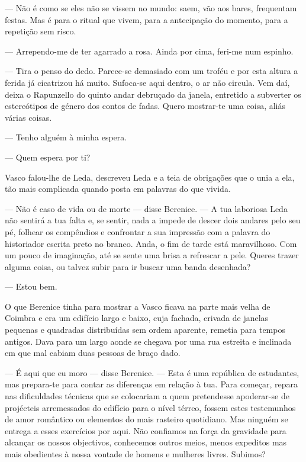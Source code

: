 --- Não é como se eles não se vissem no mundo: saem, vão aos bares,
  frequentam festas. Mas é para o ritual que vivem, para a antecipação
  do momento, para a repetição sem risco.

--- Arrependo-me de ter agarrado a rosa. Ainda por cima, feri-me num
  espinho.

--- Tira o penso do dedo. Parece-se demasiado com um troféu e por esta
altura a ferida já cicatrizou há muito. Sufoca-se aqui dentro, o ar
não circula. Vem daí, deixa o Rapunzello do quinto
andar debruçado da janela, entretido a subverter os estereótipos de
género dos contos de fadas. Quero mostrar-te uma coisa, aliás várias
coisas.

--- Tenho alguém à minha espera.

--- Quem espera por ti?


Vasco falou-lhe de Leda, descreveu Leda e a teia de obrigações que o
unia a ela, tão mais complicada quando posta em palavras do que vivida.

--- Não é caso de vida ou de morte --- disse Berenice. --- A tua laboriosa
  Leda não sentirá a tua falta e, se sentir, nada a impede de descer
  dois andares pelo seu pé, folhear os compêndios e confrontar a sua
  impressão com a palavra do historiador escrita preto no branco.
  Anda, o fim de tarde está maravilhoso. Com um pouco de imaginação,
  até se sente uma brisa a refrescar a pele. Queres trazer alguma coisa,
  ou talvez subir para ir buscar uma banda desenhada?

--- Estou bem.


O que Berenice tinha para mostrar a Vasco ficava na parte mais velha de
Coimbra e era um edifício largo e baixo, cuja fachada, crivada de
janelas pequenas e quadradas distribuídas sem ordem aparente, remetia
para tempos antigos. Dava para um largo aonde se chegava por uma rua
estreita e inclinada em que mal cabiam duas pessoas de braço dado.

--- É aqui que eu moro --- disse Berenice. --- Esta é uma república de
  estudantes, mas prepara-te para contar as diferenças em relação à
  tua. Para começar, repara nas dificuldades
técnicas que se colocariam a quem pretendesse apoderar-se de projécteis
arremessados do edifício para o nível térreo, fossem estes testemunhos
de amor romântico ou elementos do mais rasteiro quotidiano. Mas ninguém
se entrega a esses exercícios por aqui. Não confiamos na força da
gravidade para alcançar os nossos objectivos, conhecemos outros meios,
menos expeditos mas mais obedientes à nossa vontade de homens e mulheres livres. Subimos?

